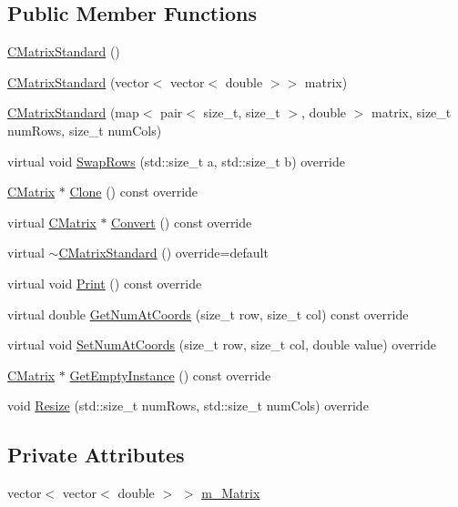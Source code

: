 \subsection*{Public Member Functions}
\begin{DoxyCompactItemize}
\item 
\hyperlink{classCMatrixStandard_ad862ccde0cbe3a1f72e724091040475d}{C\+Matrix\+Standard} ()
\item 
\hyperlink{classCMatrixStandard_a5ae792cb1f82cfd0f8710f22e6c03588}{C\+Matrix\+Standard} (vector$<$ vector$<$ double $>$$>$ matrix)
\item 
\hyperlink{classCMatrixStandard_ae2f8784f0d63aab266bbd144c5cc10c6}{C\+Matrix\+Standard} (map$<$ pair$<$ size\+\_\+t, size\+\_\+t $>$, double $>$ matrix, size\+\_\+t num\+Rows, size\+\_\+t num\+Cols)
\item 
virtual void \hyperlink{classCMatrixStandard_a8c8a6ce02302a423928b725e41c7730a}{Swap\+Rows} (std\+::size\+\_\+t a, std\+::size\+\_\+t b) override
\item 
\hyperlink{classCMatrix}{C\+Matrix} $\ast$ \hyperlink{classCMatrixStandard_a30885c9a67bfe07b8379f7dd7a782ce4}{Clone} () const override
\item 
virtual \hyperlink{classCMatrix}{C\+Matrix} $\ast$ \hyperlink{classCMatrixStandard_a73f39b1ac5602dbd233df469ba8f0c3b}{Convert} () const override
\item 
virtual \hyperlink{classCMatrixStandard_af1c8dfb0c0bdc2933fe19dc7deef0a80}{$\sim$\+C\+Matrix\+Standard} () override=default
\item 
virtual void \hyperlink{classCMatrixStandard_a0ace6054f9ec1fb2b26e0683034e48bd}{Print} () const override
\item 
virtual double \hyperlink{classCMatrixStandard_a277c77a453dccdac55de180bb63a8a7f}{Get\+Num\+At\+Coords} (size\+\_\+t row, size\+\_\+t col) const override
\item 
virtual void \hyperlink{classCMatrixStandard_a7fe5561630fbc65f7aeac5bd54499c13}{Set\+Num\+At\+Coords} (size\+\_\+t row, size\+\_\+t col, double value) override
\item 
\hyperlink{classCMatrix}{C\+Matrix} $\ast$ \hyperlink{classCMatrixStandard_a17e51335d1d9e731441a8205536697f7}{Get\+Empty\+Instance} () const override
\item 
void \hyperlink{classCMatrixStandard_ad135e13127c58f91c325a131d1dc8a74}{Resize} (std\+::size\+\_\+t num\+Rows, std\+::size\+\_\+t num\+Cols) override
\end{DoxyCompactItemize}
\subsection*{Private Attributes}
\begin{DoxyCompactItemize}
\item 
vector$<$ vector$<$ double $>$ $>$ \hyperlink{classCMatrixStandard_a4b0bafe59e3358e0d3fdbcc42b584dec}{m\+\_\+\+Matrix}
\end{DoxyCompactItemize}
